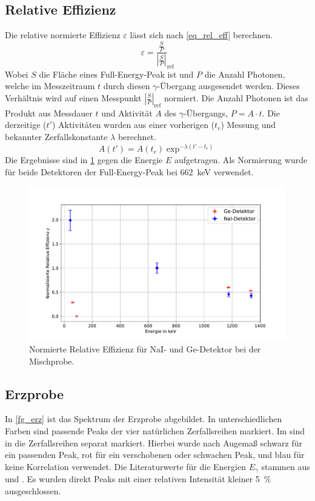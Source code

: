\documentclass[
	a4paper,
	12pt,
	pagesize,
	ngerman
]{scrartcl}
\begin{document}
\subsection{Relative Effizienz}
Die relative normierte Effizienz $\varepsilon$ lässt sich nach \cref{eq_rel_eff} berechnen.
\begin{equation}
	\label{eq_rel_eff}
	\varepsilon = \frac{\frac{S}{P}}{\left|\frac{S}{P}\right|}_{\text{ref}}
\end{equation}
Wobei $S$ die Fläche eines Full-Energy-Peak ist und $P$ die Anzahl Photonen, welche im Messzeitraum $t$ durch diesen $\gamma$-Übergang ausgesendet werden.
Dieses Verhältnis wird auf einen Messpunkt $\left|\frac{S}{P}\right|_{\text{ref}}$ normiert.
Die Anzahl Photonen ist das Produkt aus Messdauer $t$ und Aktivität $A$ des $\gamma$-Übergangs, $P=A\cdot t$.
Die derzeitige ($t'$) Aktivitäten wurden aus einer vorherigen ($t_r$) Messung und bekannter Zerfallskonstante $\lambda$ berechnet.
\begin{equation}
	A(t') = A(t_r)\exp^{-\lambda (t'-t_r)}
\end{equation}
Die Ergebnisse sind in \cref{fg_eff} gegen die Energie $E$ aufgetragen.
Als Normierung wurde für beide Detektoren der Full-Energy-Peak bei \SI{662}{keV} verwendet.

	\begin{figure}[H]
			\includegraphics[width= 1 \linewidth]{img/eff}
			\caption{
			Normierte Relative Effizienz für NaI- und Ge-Detektor bei der Mischprobe.
			}
			\label{fg_eff}
	\end{figure}
\subsection{Erzprobe}
	In \cref{fg_erz} ist das Spektrum der Erzprobe abgebildet.
	In unterschiedlichen Farben sind passende Peaks der vier natürlichen Zerfallsreihen markiert.
	Im  sind in  die Zerfallsreihen separat markiert.
	Hierbei wurde nach Augemaß schwarz für ein passenden Peak, rot für ein verschobenen oder schwachen Peak, und blau für keine Korrelation verwendet.
	Die Literaturwerte für die Energien $E_\gamma$ stammen aus \cite{erze1} und \cite{erze2}.
	Es wurden direkt Peaks mit einer relativen Intensität kleiner \SI{5}{\percent} ausgeschlossen.
\end{document}
